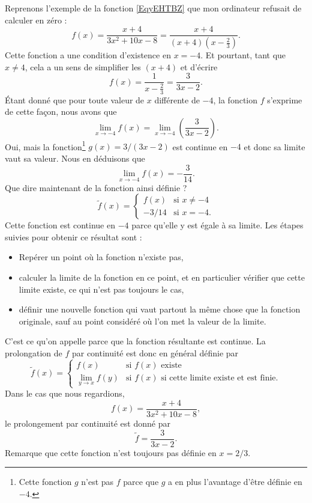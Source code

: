 Reprenons l'exemple de la fonction \eqref{EqyEHTBZ} que mon ordinateur refusait de calculer en zéro :
\begin{equation}
f(x)=\frac{ x+4 }{ 3x^2+10x-8 }=\frac{ x+4 }{ (x+4)\left( x-\frac{ 2 }{ 3 } \right) }.
\end{equation}
Cette fonction a une condition d'existence en $x=-4$. Et pourtant, tant que $x\neq 4$, cela a un sens de simplifier les $(x+4)$ et d'écrire
\[ 
  f(x)=\frac{ 1 }{ x-\frac{ 2 }{ 3 } }=\frac{ 3 }{ 3x-2 }.
\]
Étant donné que pour toute valeur de $x$ différente de $-4$, la fonction $f$ s'exprime de cette façon, nous avons que
\[ 
  \lim_{x\to -4}f(x)=\lim_{x\to -4}\left(\frac{ 3 }{ 3x-2 }\right).
\]
Oui, mais la fonction\footnote{Cette fonction $g$ n'est pas $f$ parce que $g$ a en plus l'avantage d'être définie en $-4$.} $g(x)=3/(3x-2)$ est continue en $-4$ et donc sa limite vaut sa valeur. Nous en déduisons que
\[ 
  \lim_{x\to -4}f(x)=-\frac{ 3 }{ 14 }.
\]
Que dire maintenant de la fonction ainsi définie ?
\begin{equation}
\tilde f(x)=
\begin{cases}
f(x)&\text{si $x\neq -4$}\\
-3/14&\text{si $x=-4$}.
\end{cases}
\end{equation}
Cette fonction est continue en $-4$ parce qu'elle y est égale à sa limite. Les étapes suivies pour obtenir ce résultat sont :
\begin{itemize}
\item Repérer un point où la fonction n'existe pas,
\item calculer la limite de la fonction en ce point, et en particulier vérifier que cette limite existe, ce qui n'est pas toujours le cas,
\item définir une nouvelle fonction qui vaut partout la même chose que la fonction originale, sauf au point considéré où l'on met la valeur de la limite.
\end{itemize}
C'est ce qu'on appelle  parce que la fonction résultante est continue. La prolongation de $f$ par continuité est donc en général définie par
\begin{equation}
\tilde f(x)=
\begin{cases}
f(x)            &\text{si $f(x)$ existe}\\
\lim_{y\to x}f(y)   &\text{si $f(x)$ si cette limite existe et est finie.}
\end{cases}
\end{equation}
Dans le cas que nous regardions, 
\[ 
    f(x)=\frac{ x+4 }{ 3x^2+10x-8 },
\]
le prolongement par continuité est donné par
\begin{equation}
\tilde f =\frac{ 3 }{ 3x-2 }.
\end{equation}
Remarque que cette fonction n'est toujours pas définie en $x=2/3$. 



